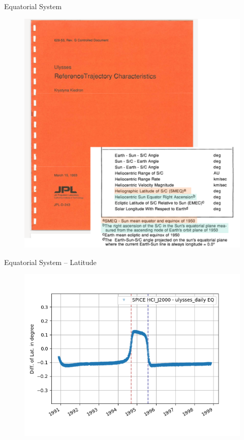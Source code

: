 \documentclass{beamer}
\begin{document}
\begin{frame}{Equatorial System}
\begin{figure}									
	\includegraphics[width=.7\textwidth]{Pics/KrystynaRef.png}
\end{figure}
\end{frame}



\begin{frame}{Equatorial System -- Latitude}
\begin{figure}									
	\includegraphics[width=1\textwidth]{Pics/EQ_LAT.png}
\end{figure}
\end{frame}
\end{document}

